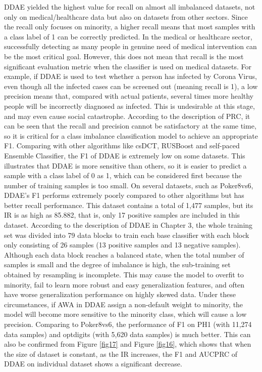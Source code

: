 DDAE yielded the highest value for recall on almost all imbalanced datasets, not only on medical/healthcare data but also on datasets from other sectors. Since the recall only focuses on minority, a higher recall means that most samples with a class label of 1 can be correctly predicted. In the medical or healthcare sector, successfully detecting as many people in genuine need of medical intervention can be the most critical goal. However, this does not mean that recall is the most significant evaluation metric when the classifier is used on medical datasets. For example, if DDAE is used to test whether a person has infected by Corona Virus, even though all the infected cases can be screened out (meaning recall is 1), a low precision means that, compared with actual patients, several times more healthy people will be incorrectly diagnosed as infected. This is undesirable at this stage, and may even cause social catastrophe. According to the description of PRC, it can be seen that the recall and precision cannot be satisfactory at the same time, so it is critical for a class imbalance classification model to achieve an appropriate F1. Comparing with other algorithms like csDCT, RUSBoost and self-paced Ensemble Classifier, the F1 of DDAE is extremely low on some datasets. This illustrates that DDAE is more sensitive than others, so it is easier to predict a sample with a class label of 0 as 1, which can be considered first because the number of training samples is too small. On several datasets, such as Poker8vs6, DDAE's F1 performs extremely poorly compared to other algorithms but has better recall performance. This dataset contains a total of 1,477 samples, but its IR is as high as 85.882, that is, only 17 positive samples are included in this dataset. According to the description of DDAE in Chapter 3, the whole training set was divided into 79 data blocks to train each base classifier with each block only consisting of 26 samples (13 positive samples and 13 negative samples). Although each data block reaches a balanced state, when the total number of samples is small and the degree of imbalance is high, the sub-training set obtained by resampling is incomplete. This may cause the model to overfit to minority, fail to learn more robust and easy generalization features, and often have worse generalization performance on highly skewed data. Under these circumstances, if AWA in DDAE assign a non-default weight to minority, the model will become more sensitive to the minority class, which will cause a low precision. Comparing to Poker8vs6, the performance of F1 on PH1 (with 11,274 data samples) and optdigits (with 5,620 data samples) is much better. This can also be confirmed from Figure \ref{fig17} and Figure \ref{fig16}, which shows that when the size of dataset is constant, as the IR increases, the F1 and AUCPRC of DDAE on individual dataset shows a significant decrease.

